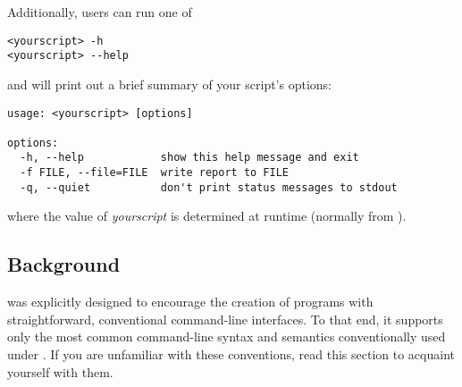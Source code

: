 Additionally, users can run one of
\begin{verbatim}
<yourscript> -h
<yourscript> --help
\end{verbatim}

and  will print out a brief summary of your script's
options:
\begin{verbatim}
usage: <yourscript> [options]

options:
  -h, --help            show this help message and exit
  -f FILE, --file=FILE  write report to FILE
  -q, --quiet           don't print status messages to stdout
\end{verbatim}

where the value of \emph{yourscript} is determined at runtime (normally
from ).


\subsection{Background\label{optparse-background}}

 was explicitly designed to encourage the creation of programs with
straightforward, conventional command-line interfaces.  To that end, it
supports only the most common command-line syntax and semantics
conventionally used under \UNIX{}.  If you are unfamiliar with these
conventions, read this section to acquaint yourself with them.


